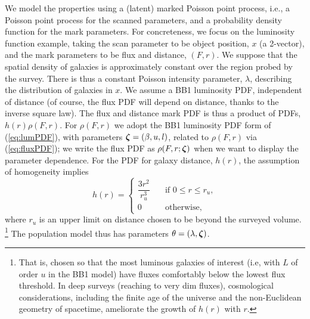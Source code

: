 We model the properties using a (latent) marked Poisson point process, i.e., a Poisson point process for the scanned parameters, and a probability density function for the mark parameters.
For concreteness, we focus on the luminosity function example, taking the scan parameter to be object position, $x$ (a 2-vector), and the mark parameters to be flux and distance, $(F, r)$.
We suppose that the spatial density of galaxies is approximately constant over the region probed by the survey.
There is thus a constant Poisson intensity parameter, $\lambda$, describing the distribution of galaxies in $x$.
We assume a BB1 luminosity PDF, independent of distance (of course, the flux PDF will depend on distance, thanks to the inverse square law).
The flux and distance mark PDF is thus a product of PDFs, $h(r)\rho(F,r)$.
For $\rho(F,r)$ we adopt the BB1 luminosity PDF form of (\ref{eq:lumPDF}), with parameters $\boldsymbol{\zeta} = (\beta,u,l)$, related to $\rho(F,r)$ via (\ref{eq:fluxPDF}); we write the flux PDF as $\rho(F,r; \boldsymbol{\zeta})$ when we want to display the parameter dependence.
For the PDF for galaxy distance, $h(r)$, the assumption of homogeneity implies
\begin{equation}\label{eq:distPDF}
h(r) = 
\begin{cases} 
    \dfrac{3r^{2}}{r_u^{3}} & \quad \text{if } 0\leq r\leq r_u,\\
    0 & \quad \text{otherwise},
\end{cases} 
\end{equation}
where $r_u$ is an upper limit on distance chosen to be beyond the surveyed volume.%
\footnote{That is, chosen so that the most luminous galaxies of interest (i.e, with $L$ of order $u$ in the BB1 model) have fluxes comfortably below the lowest flux threshold.
In deep surveys (reaching to very dim fluxes), cosmological considerations, including the finite age of the universe and the non-Euclidean geometry of spacetime, ameliorate the growth of $h(r)$ with $r$.}
The population model thus has parameters $\theta = (\lambda,\boldsymbol{\zeta})$.

